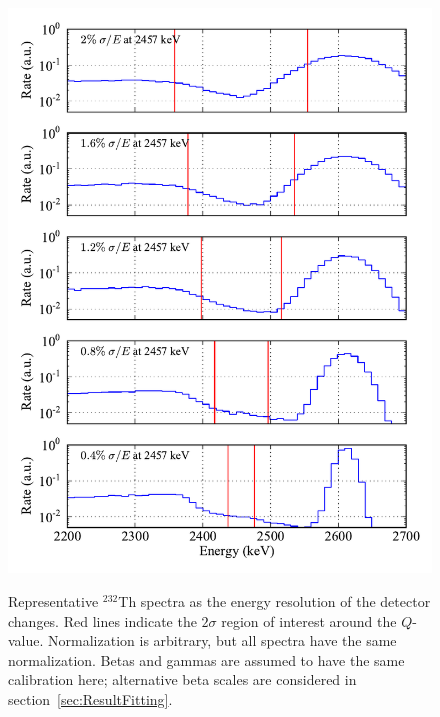 \begin{figure}
\begin{center}
\includegraphics[keepaspectratio=true,width=.92\textwidth]{scripts/Th_Spectra_vs_Res.pdf}
\end{center}
\renewcommand{\baselinestretch}{1}
\small\normalsize
\begin{quote}
\caption{Representative $^{232}$Th spectra as the energy resolution of the detector changes.  Red lines indicate the $2\sigma$ region of interest around the $Q$-value.  Normalization is arbitrary, but all spectra have the same normalization.  Betas and gammas are assumed to have the same calibration here; alternative beta scales are considered in section~\ref{sec:ResultFitting}.}
\label{fig:ThSpectraVsResolution}
\end{quote}
\end{figure}
\renewcommand{\baselinestretch}{2}
\small\normalsize

